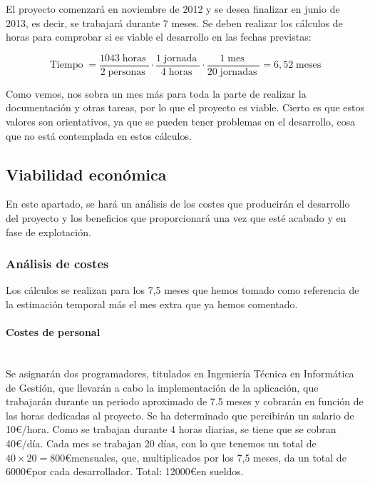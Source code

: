 El proyecto comenzará en noviembre de 2012 y se desea finalizar en junio de 2013, es decir, se trabajará durante 7 meses. Se deben realizar los cálculos de horas para comprobar si es viable el desarrollo en las fechas previstas:
\newcommand{\tiempo}{\operatorname{Tiempo}}
\newcommand{\horas}{\operatorname{horas}}
\newcommand{\persona}{\operatorname{personas}}
\newcommand{\jornada}{\operatorname{jornada}}
\newcommand{\jornadas}{\operatorname{jornadas}}
\newcommand{\mes}{\operatorname{mes}}
\newcommand{\meses}{\operatorname{meses}}
\newcommand{\semana}{\operatorname{semana}}
\newcommand{\hora}{\operatorname{hora}}

\[
 \tiempo = \dfrac{1043 \horas}{2 \persona} \cdot \dfrac{1 \jornada}{4 \horas} \cdot \dfrac{1 \mes}{20 \jornadas} = 6,52 \meses
\]

Como vemos, nos sobra un mes más para toda la parte de realizar la documentación y otras tareas, por lo que el proyecto es viable. Cierto es que estos valores son orientativos, ya que se pueden tener problemas en el desarrollo, cosa que no está contemplada en estos cálculos.


\subsection{Viabilidad económica}
En este apartado, se hará un análisis de los costes que producirán el desarrollo del proyecto y los beneficios que proporcionará una vez que esté acabado y en fase de explotación.

\subsubsection{Análisis de costes}
Los cálculos se realizan para los 7,5 meses que hemos tomado como referencia de la estimación temporal más el mes extra que ya hemos comentado.

\paragraph{Costes de personal}\mbox{} \\
\indent Se asignarán dos programadores, titulados en Ingeniería Técnica en Informática de Gestión, que llevarán a cabo la implementación de la aplicación, que trabajarán durante un periodo aproximado de 7.5 meses y cobrarán en función de las horas dedicadas al proyecto. Se ha determinado que percibirán un salario  de 10\euro /hora. Como se trabajan durante 4 horas diarias, se tiene que se cobran 40\euro /día. Cada mes se trabajan 20 días, con lo que tenemos un total de $40\times20=800$\euro mensuales, que, multiplicados por los 7,5 meses, da un total de 6000\euro por cada desarrollador. Total: 12000\euro en sueldos.

